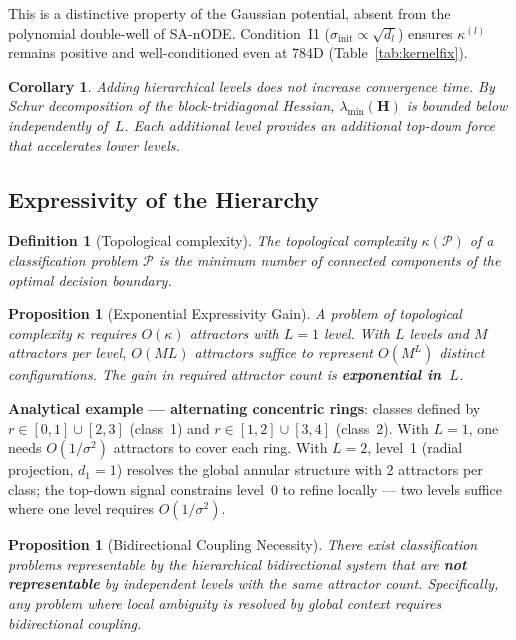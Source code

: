 \documentclass[11pt,a4paper]{article}
\newtheorem{proposition}[theorem]{Proposition}
\newtheorem{corollary}[theorem]{Corollary}
\newtheorem{definition}[theorem]{Definition}
\begin{document}
This is a distinctive property of the Gaussian potential, absent from the polynomial double-well
of SA-nODE.  Condition~I1 ($\sigma_{\mathrm{init}} \propto \sqrt{d_l}$) ensures $\kappa^{(l)}$
remains positive and well-conditioned even at 784D (Table~\ref{tab:kernelfix}).

\begin{corollary}
Adding hierarchical levels does not increase convergence time.  By Schur decomposition of the
block-tridiagonal Hessian, $\lambda_{\min}(\mathbf{H})$ is bounded below independently of~$L$.
Each additional level provides an additional top-down force that accelerates lower levels.
\end{corollary}

\subsection{Expressivity of the Hierarchy}
\label{sec:theory:expressivity}

\begin{definition}[Topological complexity]
The topological complexity $\kappa(\mathcal{P})$ of a classification problem $\mathcal{P}$ is the
minimum number of connected components of the optimal decision boundary.
\end{definition}

\begin{proposition}[Exponential Expressivity Gain]
A problem of topological complexity $\kappa$ requires $O(\kappa)$ attractors with $L=1$ level.
With $L$ levels and $M$ attractors per level, $O(ML)$ attractors suffice to represent
$O(M^L)$ distinct configurations.  The gain in required attractor count is \textbf{exponential
in~$L$}.
\label{prop:expressivity}
\end{proposition}

\textbf{Analytical example --- alternating concentric rings}: classes defined by
$r \in [0,1] \cup [2,3]$ (class~1) and $r \in [1,2] \cup [3,4]$ (class~2).  With $L=1$, one
needs $O(1/\sigma^2)$ attractors to cover each ring.  With $L=2$, level~1 (radial projection,
$d_1=1$) resolves the global annular structure with 2 attractors per class; the top-down signal
constrains level~0 to refine locally --- two levels suffice where one level requires
$O(1/\sigma^2)$.

\begin{proposition}[Bidirectional Coupling Necessity]
There exist classification problems representable by the hierarchical bidirectional system that
are \textbf{not representable} by independent levels with the same attractor count.
Specifically, any problem where local ambiguity is resolved by global context requires
bidirectional coupling.
\label{prop:bidi_necessary}
\end{proposition}
\end{document}
